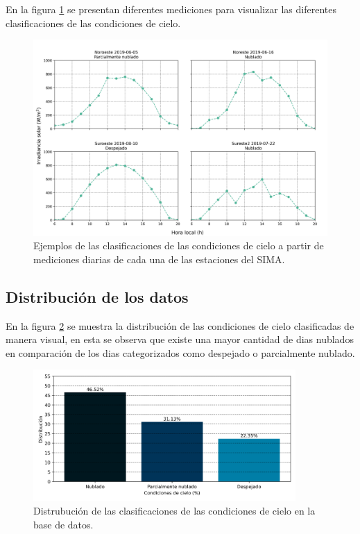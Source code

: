 En la figura \ref{fig:example_sky_conditions} se presentan diferentes mediciones para visualizar las diferentes clasificaciones de las condiciones de cielo.

\begin{figure}[H]
	\centering
	\includegraphics[width=12cm]{Graphics/example_sky_conditions.png}
	\caption{Ejemplos de las clasificaciones de las condiciones de cielo a partir de mediciones diarias de cada una de las estaciones del SIMA.}
	\label{fig:example_sky_conditions}
\end{figure}

\subsection{Distribución de los datos}

En la figura \ref{fig:distribution} se muestra la distribución de las condiciones de cielo clasificadas de manera visual, en esta se observa que existe una mayor cantidad de dias nublados en comparación de los dias categorizados como despejado o parcialmente nublado.

\begin{figure}[H]
	\centering
	\includegraphics[width=10cm]{Graphics/distribution_classification.png}
	\caption{Distrubución de las clasificaciones de las condiciones de cielo en la base de datos.}
	\label{fig:distribution}
\end{figure}

